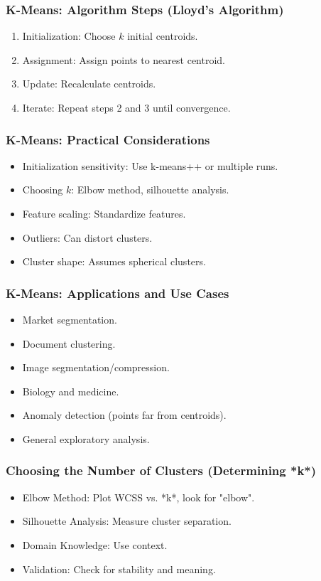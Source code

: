 \documentclass[aspectratio=169]{beamer}
\begin{document}
\begin{frame}
\frametitle{K-Means: Algorithm Steps (Lloyd's Algorithm)}
\begin{enumerate}
    \item Initialization: Choose $k$ initial centroids.
    \item Assignment: Assign points to nearest centroid.
    \item Update: Recalculate centroids.
    \item Iterate: Repeat steps 2 and 3 until convergence.
\end{enumerate}
\end{frame}

\begin{frame}
\frametitle{K-Means: Practical Considerations}
\begin{itemize}
    \item Initialization sensitivity: Use k-means++ or multiple runs.
    \item Choosing $k$: Elbow method, silhouette analysis.
    \item Feature scaling: Standardize features.
    \item Outliers: Can distort clusters.
    \item Cluster shape: Assumes spherical clusters.
\end{itemize}
\end{frame}

\begin{frame}
\frametitle{K-Means: Applications and Use Cases}
\begin{itemize}
    \item Market segmentation.
    \item Document clustering.
    \item Image segmentation/compression.
    \item Biology and medicine.
    \item Anomaly detection (points far from centroids).
    \item General exploratory analysis.
\end{itemize}
\end{frame}

\begin{frame}
\frametitle{Choosing the Number of Clusters (Determining *k*)}
\begin{itemize}
    \item Elbow Method: Plot WCSS vs. *k*, look for "elbow".
    \item Silhouette Analysis: Measure cluster separation.
    \item Domain Knowledge:  Use context.
    \item Validation:  Check for stability and meaning.
\end{itemize}
\end{frame}
\end{document}
